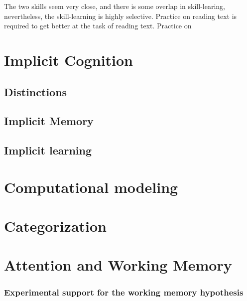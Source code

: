 \documentclass[
  oneside,
  12pt]{crumpbook}
\begin{document}
The two skills seem very close, and there is some overlap in skill-learing, nevertheless, the skill-learning is highly selective. Practice on reading text is required to get better at the task of reading text. Practice on

\hypertarget{implicit-cognition}{%
\chapter{Implicit Cognition}\label{implicit-cognition}}

\hypertarget{distinctions}{%
\section{Distinctions}\label{distinctions}}

\hypertarget{implicit-memory}{%
\section{Implicit Memory}\label{implicit-memory}}

\hypertarget{implicit-learning}{%
\section{Implicit learning}\label{implicit-learning}}

\hypertarget{computational-modeling}{%
\chapter{Computational modeling}\label{computational-modeling}}

\hypertarget{categorization}{%
\chapter{Categorization}\label{categorization}}

\hypertarget{attention-and-working-memory}{%
\chapter{Attention and Working Memory}\label{attention-and-working-memory}}

\hypertarget{experimental-support-for-the-working-memory-hypothesis}{%
\subsection{Experimental support for the working memory hypothesis}\label{experimental-support-for-the-working-memory-hypothesis}}
\end{document}

